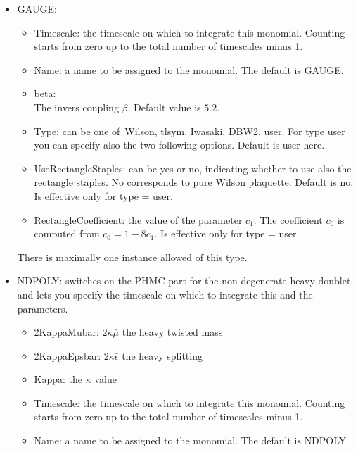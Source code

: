 \begin{itemize}
\item {\ttfamily GAUGE}: 
  \begin{itemize}
  \item {\ttfamily Timescale}: the timescale on which to integrate
    this monomial. Counting starts from zero up to the total number of
    timescales minus 1.
  \item {\ttfamily Name}: a name to be assigned to the monomial. The
    default is {\ttfamily GAUGE}.

  \item {\ttfamily beta}:\\
    The invers coupling $\beta$. Default value is $5.2$.
    
  \item {\ttfamily Type}: can be one of\ {\ttfamily Wilson, tlsym,
      Iwasaki, DBW2, user}. For type user you can specify also the two
    following options. Default is {\ttfamily user} here.
  \item {\ttfamily UseRectangleStaples}: can be yes or no, indicating
    whether to use also the rectangle staples. No corresponds to pure
    Wilson plaquette. Default is no. Is effective only for {\ttfamily
      type = user}.
  \item {\ttfamily RectangleCoefficient}: the value of the parameter
    $c_1$. The coefficient $c_0$ is computed from $c_0 = 1-8c_1$. Is
    effective only for {\ttfamily type = user}.
  \end{itemize}
  There is maximally one instance allowed of this type.
  
  
\item {\ttfamily NDPOLY}: switches
  on the PHMC part for the non-degenerate heavy doublet and lets you
  specify the timescale on which to integrate this and the parameters.
  \begin{itemize}
  \item {\ttfamily 2KappaMubar}: $2\kappa\bar\mu$ the heavy twisted mass
  \item {\ttfamily 2KappaEpsbar}: $2\kappa\bar\epsilon$ the heavy
    splitting
  \item {\ttfamily Kappa}: the $\kappa$ value
  \item {\ttfamily Timescale}: the timescale on which to integrate
    this monomial. Counting starts from zero up to the total number of
    timescales minus 1.

  \item {\ttfamily Name}: a name to be assigned to the monomial. The
    default is {\ttfamily NDPOLY}


\end{itemize}
\end{itemize}
